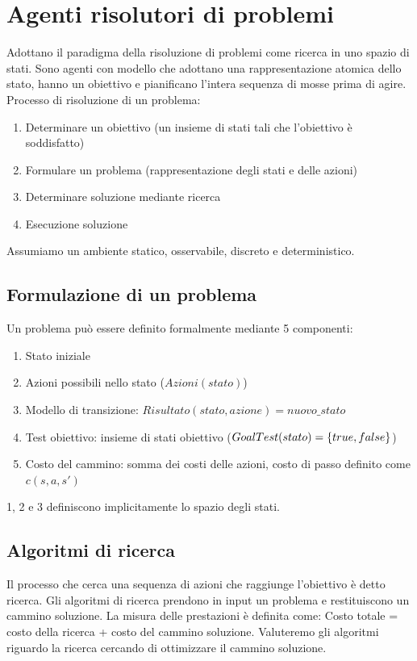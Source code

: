\documentclass{article}
\begin{document}
\section{Agenti risolutori di problemi}
Adottano il paradigma della risoluzione di problemi come ricerca in uno spazio di stati. Sono agenti con modello che adottano una rappresentazione atomica dello stato, hanno un obiettivo e pianificano l'intera sequenza di mosse prima di agire. \newline
Processo di risoluzione di un problema:
\begin{enumerate}
    \item Determinare un obiettivo (un insieme di stati tali che l'obiettivo è soddisfatto)
    \item Formulare un problema (rappresentazione degli stati e delle azioni)
    \item Determinare soluzione mediante ricerca
    \item Esecuzione soluzione
\end{enumerate}
Assumiamo un ambiente statico, osservabile, discreto e deterministico.

\subsection{Formulazione di un problema}
Un problema può essere definito formalmente mediante 5 componenti:
\begin{enumerate}
    \item Stato iniziale
    \item Azioni possibili nello stato ($Azioni(stato)$)
    \item Modello di transizione: $Risultato(stato, azione) = nuovo\_stato$
    \item Test obiettivo: insieme di stati obiettivo ($Goal\-Test(stato)=\{true,false\}$)
    \item Costo del cammino: somma dei costi delle azioni, costo di passo definito come $c(s,a,s')$
\end{enumerate}
1, 2 e 3 definiscono implicitamente lo spazio degli stati.

\subsection{Algoritmi di ricerca}
Il processo che cerca una sequenza di azioni che raggiunge l'obiettivo è detto ricerca. Gli algoritmi di ricerca prendono in input un problema e restituiscono un cammino soluzione. La misura delle prestazioni è definita come: Costo totale = costo della ricerca + costo del cammino soluzione. Valuteremo gli algoritmi riguardo la ricerca cercando di ottimizzare il cammino soluzione.
\end{document}
